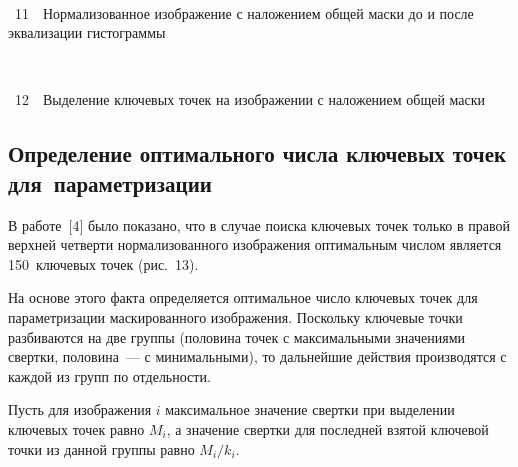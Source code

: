 \begin{multicols}{2}
\begin{center} %
\vspace*{6pt}
\mbox{%
\epsfxsize=78mm
}
\end{center}
{{\figurename~11}\ \ \small{Нормализованное изображение с наложением общей маски до и после эквализации 
гистограммы}}


\bigskip
\addtocounter{figure}{1}


\begin{center} %
\mbox{%
\epsfxsize=78mm
}
\end{center}
{{\figurename~12}\ \ \small{Выделение ключевых точек на изображении с наложением общей маски}}


\addtocounter{figure}{1}



\subsection{Определение оптимального числа ключевых точек 
для~параметризации}

В работе~[4] было показано, что в случае поиска ключевых точек только в правой 
верхней четверти нормализованного изображения оптимальным числом является 
150~ключевых точек (рис.~13).

На основе этого факта определяется оптимальное число ключевых точек для 
параметризации маскированного изображения. Поскольку ключевые точки 
разбиваются на две группы (половина точек с максимальными значениями 
свертки, половина~--- с минимальными), то дальнейшие действия производятся с 
каждой из групп по отдельности.

Пусть для изображения $i$ максимальное значение свертки при выделении 
ключевых точек равно $M_i$, а значение свертки для последней взятой ключевой 
точки из данной группы равно $M_i/k_i$.\linebreak\vspace*{-12pt}

\pagebreak


\end{multicols}
